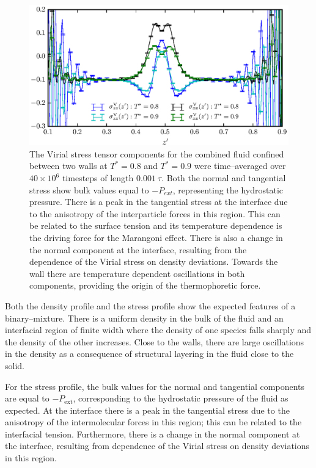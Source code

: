 \begin{figure}[h!]
\centering
\includegraphics[scale=1.0]{PisVirStress}
\caption{The Virial stress tensor components for the combined fluid confined between two walls at $T^{*} = 0.8$ and $T^{*} = 0.9$ were time--averaged over $40 \times 10^{6}$ timesteps of length $0.001\ \tau$.
Both the normal and tangential stress show bulk values equal to $-P_{ext}$, representing the hydrostatic pressure.
There is a peak in the tangential stress at the interface due to the anisotropy of the interparticle forces in this region.
This can be related to the surface tension and its temperature dependence is the driving force for the Marangoni effect.
There is also a change in the normal component at the interface, resulting from the dependence of the Virial stress on density deviations.
Towards the wall there are temperature dependent oscillations in both components, providing the origin of the thermophoretic force.
}
\label{PisVirStress}
\end{figure}

Both the density profile and the stress profile show the expected features of a binary--mixture. 
There is a uniform density in the bulk of the fluid and an interfacial region of finite width where the density of one species falls sharply and the density of the other increases.
Close to the walls, there are large oscillations in the density as a consequence of structural layering in the fluid close to the solid.

For the stress profile, the bulk values for the normal and tangential components are equal to $-P_{\mathrm{ext}}$, corresponding to the hydrostatic pressure of the fluid as expected.
At the interface there is a peak in the tangential stress due to the anisotropy of the intermolecular forces in this region; this can be related to the interfacial tension.\cite{Marchand2011}
Furthermore, there is a change in the normal component at the interface, resulting from dependence of the Virial stress on density deviations in this region.

